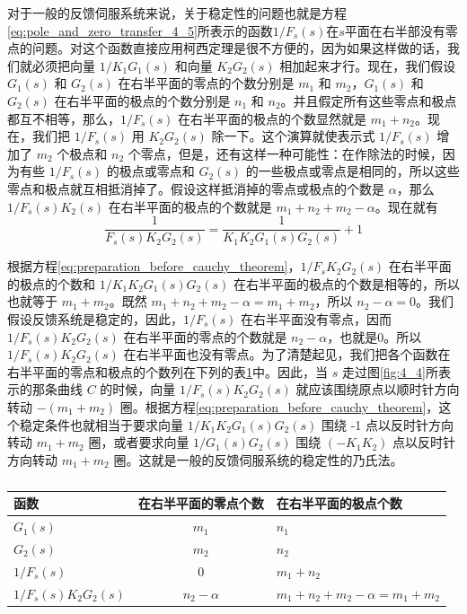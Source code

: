 对于一般的反馈伺服系统来说，关于稳定性的问题也就是方程\eqref{eq:pole_and_zero_transfer_4_5}所表示的函数$1/F_s(s)$在$s$平面在右半部没有零点的问题。对这个函数直接应用柯西定理是很不方便的，因为如果这样做的话，我们就必须把向量 $1/K_1G_1(s)$ 和向量 $K_2G_2(s)$ 相加起来才行。现在，我们假设 $G_1(s)$ 和 $G_2(s)$ 在右半平面的零点的个数分别是 $m_1$ 和 $m_2$，$G_1(s)$ 和 $G_2(s)$ 在右半平面的极点的个数分别是 $n_1$ 和 $n_2$。并且假定所有这些零点和极点都互不相等，那么，$1/F_s(s)$ 在右半平面的极点的个数显然就是 $m_1+n_2$。现在，我们把 $1/F_s(s)$ 用 $K_2G_2(s)$ 除一下。这个演算就使表示式 $1/F_s(s)$ 增加了 $m_2$ 个极点和 $n_2$ 个零点，但是，还有这样一种可能性：在作除法的时候，因为有些 $1/F_s(s)$ 的极点或零点和 $G_2(s)$ 的一些极点或零点是相同的，所以这些零点和极点就互相抵消掉了。假设这样抵消掉的零点或极点的个数是 $\alpha$，那么 $1/F_s(s)K_2(s)$ 在右半平面的极点的个数就是 $m_1+n_2+m_2-\alpha$。现在就有
\begin{equation}\label{eq:preparation_before_cauchy_theorem}
\frac{1}{F_s(s)K_2G_2(s)} = \frac{1}{K_1K_2G_1(s)G_2(s)} + 1
\end{equation}

根据方程\eqref{eq:preparation_before_cauchy_theorem}，$1/F_sK_2G_2(s)$ 在右半平面的极点的个数和 $1/K_1K_2G_1(s)G_2(s)$ 在右半平面的极点的个数是相等的，所以也就等于 $m_1+m_2$。既然 $m_1+n_2+m_2-\alpha=m_1+m_2$，所以 $n_2-\alpha=0$。我们假设反馈系统是稳定的，因此，$1/F_s(s)$ 在右半平面没有零点，因而 $1/F_s(s)K_2G_2(s)$ 在右半平面的零点的个数就是 $n_2-\alpha$，也就是0。所以 $1/F_s(s)K_2G_2(s)$ 在右半平面也没有零点。为了清楚起见，我们把各个函数在右半平面的零点和极点的个数列在下列的表\ref{table:pole_and_zero_distribution}中。因此，当 $s$ 走过图\ref{fig:4_4}所表示的那条曲线 $C$ 的时候，向量 $1/F_s(s)K_2G_2(s)$ 就应该围绕原点以顺时针方向转动 $-(m_1+m_2)$ 圈。根据方程\eqref{eq:preparation_before_cauchy_theorem}，这个稳定条件也就相当于要求向量 $1/K_1K_2G_1(s)G_2(s)$ 围绕 -1 点以反时针方向转动 $m_1+m_2$ 圈，或者要求向量 $1/G_1(s)G_2(s)$ 围绕 $(-K_1K_2)$ 点以反时针方向转动 $m_1+m_2$ 圈。这就是一般的反馈伺服系统的稳定性的乃氏法。

\begin{table}[h]
    \centering
    \caption{ }
    \label{table:pole_and_zero_distribution}
    \begin{tabular}{|l|c|l|}
        \toprule
        函数 & 在右半平面的零点个数 & 在右半平面的极点个数 \\
        \midrule
        $G_1(s)$ & $m_1$ & $n_1$ \\
        
        $G_2(s)$ & $m_2$ & $n_2$ \\
        
        $1/F_s(s)$ & $0$ & $m_1 + n_2$ \\
       
        $1/F_s(s)K_2G_2(s)$ & $n_2 - \alpha$ & $m_1 + n_2 + m_2 - \alpha = m_1 + m_2$ \\
        \toprule
    \end{tabular}
\end{table}

